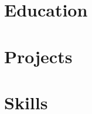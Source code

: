 \documentclass{resume}
\begin{document}
\SharedHeader

\section{Education}
\SharedEducation

\section{Projects}
\SharedCourseProject
\begin{jobduties}
  \CourseContribution
  \CourseQueries
  \CourseChecks
\end{jobduties}

\SharedToolProject
\begin{jobduties}
  \ToolWorkflow
  \ToolStorage
\end{jobduties}


\section{Skills}
\SharedSkills
\end{document}
